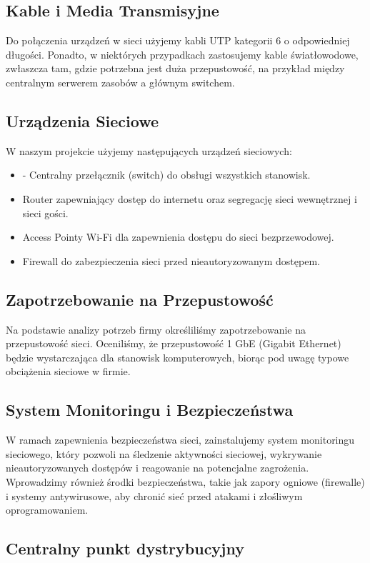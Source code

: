 \subsection{Kable i Media Transmisyjne}

    Do połączenia urządzeń w sieci użyjemy kabli UTP kategorii 6 o odpowiedniej długości. Ponadto, w niektórych przypadkach zastosujemy kable światłowodowe, zwłaszcza tam, gdzie potrzebna jest duża przepustowość, na przykład między centralnym serwerem zasobów a głównym switchem.

\subsection{Urządzenia Sieciowe}
    W naszym projekcie użyjemy następujących urządzeń sieciowych:
    \begin{itemize}
        \item - Centralny przełącznik (switch) do obsługi wszystkich stanowisk.
        \item Router zapewniający dostęp do internetu oraz segregację sieci wewnętrznej i sieci gości.
        \item Access Pointy Wi-Fi dla zapewnienia dostępu do sieci bezprzewodowej.
        \item Firewall do zabezpieczenia sieci przed nieautoryzowanym dostępem.
    \end{itemize}



\subsection{Zapotrzebowanie na Przepustowość}

    Na podstawie analizy potrzeb firmy określiliśmy zapotrzebowanie na przepustowość sieci. Oceniliśmy, że przepustowość 1 GbE (Gigabit Ethernet) będzie wystarczająca dla stanowisk komputerowych, biorąc pod uwagę typowe obciążenia sieciowe w firmie.

\subsection{System Monitoringu i Bezpieczeństwa}

    W ramach zapewnienia bezpieczeństwa sieci, zainstalujemy system monitoringu sieciowego, który pozwoli na śledzenie aktywności sieciowej, wykrywanie nieautoryzowanych dostępów i reagowanie na potencjalne zagrożenia. Wprowadzimy również środki bezpieczeństwa, takie jak zapory ogniowe (firewalle) i systemy antywirusowe, aby chronić sieć przed atakami i złośliwym oprogramowaniem.

\subsection{Centralny punkt dystrybucyjny}
